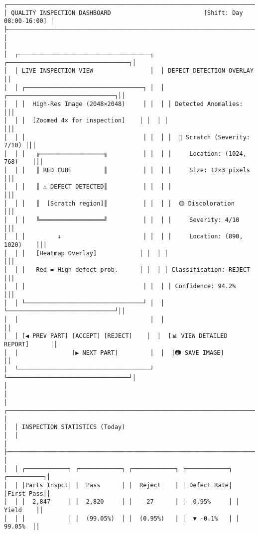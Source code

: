 \documentclass[
]{article}
\begin{document}
\begin{verbatim}
┌────────────────────────────────────────────────────────────────────────────────┐
│ QUALITY INSPECTION DASHBOARD                          [Shift: Day 08:00-16:00] │
├────────────────────────────────────────────────────────────────────────────────┤
│                                                                                │
│  ┌─────────────────────────────────────┐  ┌──────────────────────────────────┐│
│  │ LIVE INSPECTION VIEW                │  │ DEFECT DETECTION OVERLAY         ││
│  │ ┌─────────────────────────────────┐ │  │ ┌──────────────────────────────┐││
│  │ │  High-Res Image (2048×2048)     │ │  │ │ Detected Anomalies:          │││
│  │ │  [Zoomed 4× for inspection]    │ │  │ │                              │││
│  │ │                                 │ │  │ │  🔴 Scratch (Severity: 7/10) │││
│  │ │   ╔══════════════════╗          │ │  │ │     Location: (1024, 768)    │││
│  │ │   ║ RED CUBE         ║          │ │  │ │     Size: 12×3 pixels        │││
│  │ │   ║ ⚠ DEFECT DETECTED║          │ │  │ │                              │││
│  │ │   ║  [Scratch region]║          │ │  │ │  🟡 Discoloration            │││
│  │ │   ╚══════════════════╝          │ │  │ │     Severity: 4/10           │││
│  │ │         ↓                       │ │  │ │     Location: (890, 1020)    │││
│  │ │   [Heatmap Overlay]            │ │  │ │                              │││
│  │ │   Red = High defect prob.      │ │  │ │ Classification: REJECT       │││
│  │ │                                 │ │  │ │ Confidence: 94.2%            │││
│  │ └─────────────────────────────────┘ │  │ └──────────────────────────────┘││
│  │                                     │  │                                  ││
│  │ [◀ PREV PART] [ACCEPT] [REJECT]    │  │  [📊 VIEW DETAILED REPORT]      ││
│  │               [▶ NEXT PART]         │  │  [📷 SAVE IMAGE]                ││
│  └─────────────────────────────────────┘  └──────────────────────────────────┘│
│                                                                                │
│  ┌────────────────────────────────────────────────────────────────────────┐  │
│  │ INSPECTION STATISTICS (Today)                                          │  │
│  ├────────────────────────────────────────────────────────────────────────┤  │
│  │ ┌────────────┐ ┌────────────┐ ┌────────────┐ ┌────────────┐ ┌──────────┐│
│  │ │Parts Inspct│ │  Pass      │ │  Reject    │ │ Defect Rate│ │First Pass││
│  │ │  2,847     │ │  2,820     │ │    27      │ │  0.95%     │ │ Yield    ││
│  │ │            │ │  (99.05%)  │ │  (0.95%)   │ │  ▼ -0.1%   │ │  99.05%  ││

\end{verbatim}
\end{document}
